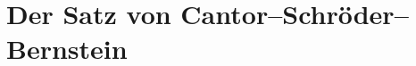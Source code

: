 \ifCSBReferenz{}\fi
\section{Der Satz von Cantor--Schröder--Bernstein}


\ifCSBReferenz
  
\else
\ifCSBLesetext
  
  
\fi

\ifCSBTabellen
  
\fi
\fi
